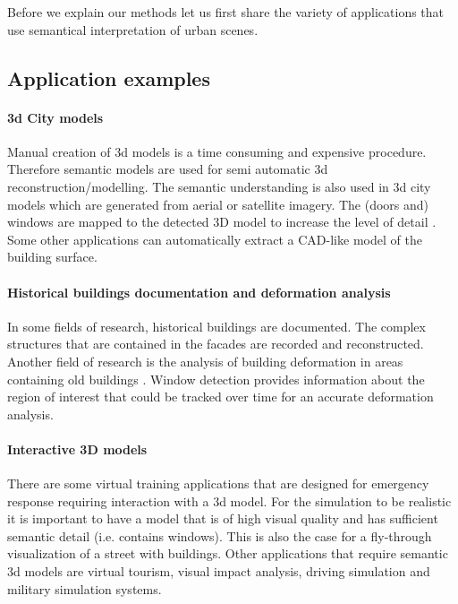 Before we explain our methods let us first share the variety of applications 
that use semantical interpretation of urban scenes.  \\

\subsection{Application examples}
\paragraph{3d City models} 
	Manual creation of 3d models is a time consuming and expensive procedure.
	Therefore semantic models are used for semi automatic 3d
	reconstruction/modelling.
	The semantic understanding is also used in 3d city models which are
	generated from aerial or satellite imagery.  The (doors and) windows are mapped to the detected 3D model to increase the level of detail \cite{Muller_procedural2}. 
	Some other applications can automatically extract a CAD-like model of
	the building surface.

\paragraph{Historical buildings documentation and deformation analysis}
	In some fields of research, historical buildings are documented.  The complex
	structures that are contained in the facades are recorded and reconstructed.
	Another field of research is the analysis of building deformation in areas
	containing old buildings \cite{deformation}.
	 Window detection provides information about the
	region of interest that could be tracked over time for an accurate
	deformation analysis.

\paragraph{Interactive 3D models}
	There are some virtual training applications that are designed for
	emergency response requiring interaction with a 3d model.  
	For the simulation to be realistic it is important to have a model that is
	of high visual quality and has sufficient semantic detail (i.e. contains
	windows).  This is also the case for a fly-through visualization of a street with
	buildings.
	Other applications that require semantic 3d models are virtual tourism,
	visual impact analysis, driving simulation and military simulation systems.

